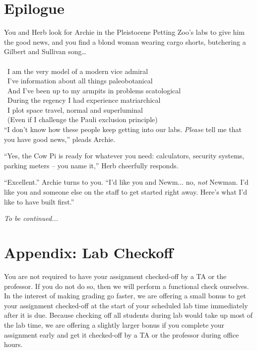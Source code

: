 \section*{Epilogue}

You and Herb look for Archie in the Pleistocene Petting Zoo's labs to give him
the good news, and you find a blond woman wearing cargo shorts, butchering a
Gilbert and Sullivan song\dots \\ \\
 \textmusicalnote\ I am the very model of a modern vice admiral \textmusicalnote \\
\textmusicalnote\ I've information about all things paleobotanical \textmusicalnote \\
\textmusicalnote\ And I've been up to my armpits in problems scatological \textmusicalnote \\
\textmusicalnote\ During the regency I had experience matriarchical \textmusicalnote \\
\textmusicalnote\ I plot space travel, normal and superluminal \textmusicalnote \\
\textmusicalnote\ (Even if I challenge the Pauli exclusion principle) \textmusicalnote \\

``I don't know how these people keep getting into our labs. \textit{Please} tell
me that you have good news,'' pleads Archie.

``Yes, the Cow Pi is ready for whatever you need: calculators, security systems,
parking meters -- you name it,'' Herb cheerfully responds.

``Excellent.'' Archie turns to you. ``I'd like you and Newm... no, \textit{not}
Newman. I'd like you and someone else on the staff to get started right away.
Here's what I'd like to have built first.''

\textit{To be continued...}


\section*{Appendix: Lab Checkoff}

You are not required to have your assignment checked-off by a TA or the
professor. If you do not do so, then we will perform a functional check
ourselves. In the interest of making grading go faster, we are offering a small
bonus to get your assignment checked-off at the start of your scheduled lab
time immediately after it is due. Because checking off all students during lab
would take up most of the lab time, we are offering a slightly larger bonus if
you complete your assignment early and get it checked-off by a TA or the
professor during office hours.

